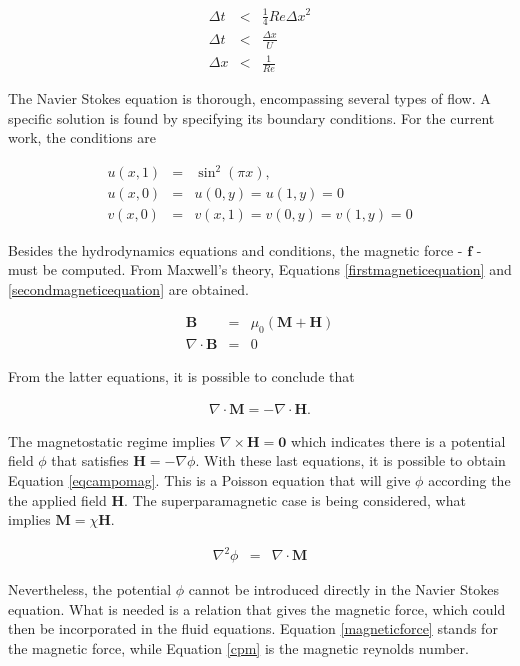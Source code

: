 \documentclass[journal]{IEEEtran}
\begin{document}
\begin{eqnarray}
\Delta t &<& \frac{1}{4}\mathit{Re}\Delta x^2 \label{stablediffusion}\\
\Delta t &<& \frac{\Delta x}{U} \label{stableadvection}\\
\Delta x &<& \frac{1}{\mathit{Re}} \label{boundarylayer}
\end{eqnarray}

The Navier Stokes equation is thorough, encompassing several types of flow. A specific solution is found by specifying its boundary conditions. For the current work, the conditions are

\begin{eqnarray}
u(x,1) & = & \sin^2(\pi x),\\
u(x,0) & = & u(0,y) = u(1,y) = 0\\
v(x,0) & = & v(x,1) = v(0, y) = v(1, y) = 0
\end{eqnarray}

Besides the hydrodynamics equations and conditions, the magnetic force - $\mathbf{f}$ - must be computed. From Maxwell's theory, Equations \ref{firstmagneticequation} and \ref{secondmagneticequation} are obtained. 

\begin{eqnarray}
\mathbf{B} &=& \mu_0(\mathbf{M}+\mathbf{H})\label{firstmagneticequation}\\
\nabla\cdot \mathbf{B} & = & 0\label{secondmagneticequation}
\end{eqnarray}

From the latter equations, it is possible to conclude that 

\begin{eqnarray}
\nabla\cdot \mathbf{M} = -\nabla\cdot\mathbf{H}	\label{mh1}.
\end{eqnarray}

The magnetostatic regime implies $\nabla\times \mathbf{H} = \mathbf{0}$ which indicates there is a potential field $\phi$ that satisfies $\mathbf{H} = -\nabla \phi$. With these last equations, it is possible to obtain Equation \ref{eqcampomag}. This is a Poisson equation that will give $\phi$ according the the applied field $\mathbf{H}$. The superparamagnetic case is being considered, what implies $\mathbf{M} = \chi \mathbf{H}$.

\begin{eqnarray}
\nabla^2\phi &=& \nabla\cdot \mathbf{M}\label{eqcampomag}
\end{eqnarray}

Nevertheless, the potential $\phi$ cannot be introduced directly in the Navier Stokes equation. What is needed is a relation that gives the magnetic force, which could then be incorporated in the fluid equations. Equation \ref{magneticforce} stands for the magnetic force, while Equation \ref{cpm} is the magnetic reynolds number.
\end{document}
